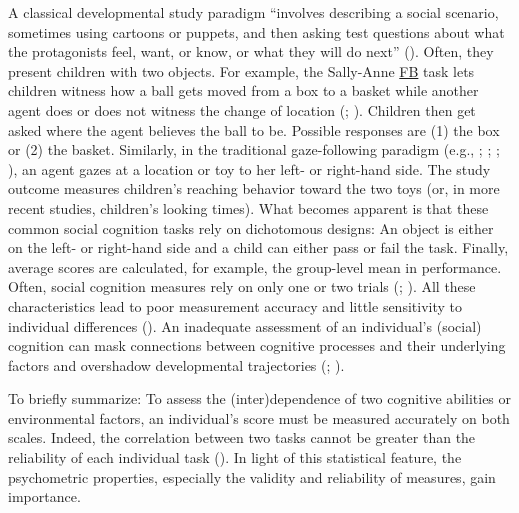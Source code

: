 \documentclass[
]{scrbook}
\begin{document}
A classical developmental study paradigm ``involves describing a social scenario, sometimes using cartoons or puppets, and then asking test questions about what the protagonists feel, want, or know, or what they will do next'' (). Often, they present children with two objects. For example, the Sally-Anne \hyperref[acronyms_FB]{FB} task lets children witness how a ball gets moved from a box to a basket while another agent does or does not witness the change of location (; ). Children then get asked where the agent believes the ball to be. Possible responses are (1) the box or (2) the basket. Similarly, in the traditional gaze-following paradigm (e.g., ; ; ; ), an agent gazes at a location or toy to her left- or right-hand side. The study outcome measures children's reaching behavior toward the two toys (or, in more recent studies, children's looking times). What becomes apparent is that these common social cognition tasks rely on dichotomous designs: An object is either on the left- or right-hand side and a child can either pass or fail the task. Finally, average scores are calculated, for example, the group-level mean in performance. Often, social cognition measures rely on only one or two trials (; ). All these characteristics lead to poor measurement accuracy and little sensitivity to individual differences (). An inadequate assessment of an individual's (social) cognition can mask connections between cognitive processes and their underlying factors and overshadow developmental trajectories (; ).

To briefly summarize: To assess the (inter)dependence of two cognitive abilities or environmental factors, an individual's score must be measured accurately on both scales. Indeed, the correlation between two tasks cannot be greater than the reliability of each individual task (). In light of this statistical feature, the psychometric properties, especially the validity and reliability of measures, gain importance.
\end{document}
